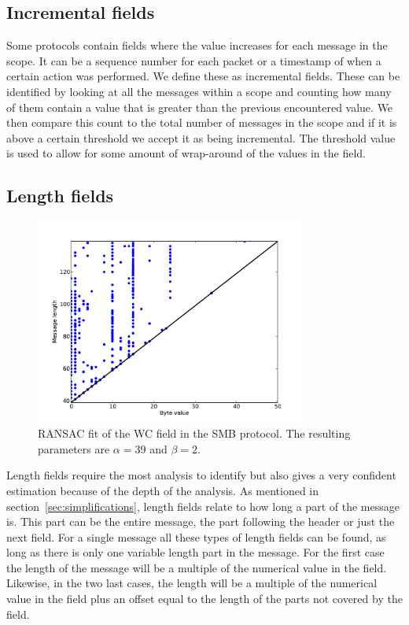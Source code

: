 \documentclass[a4paper]{report}
\begin{document}
\newpage

\subsection{Incremental fields}
Some protocols contain fields where the value increases for each message in the
scope. It can be a sequence number for each packet or a timestamp of when a
certain action was performed. We define these as incremental fields. These can
be identified by looking at all the messages within a scope and counting how
many of them contain a value that is greater than the previous encountered
value. We then compare this count to the total number of messages in the scope
and if it is above a certain threshold we accept it as being incremental. The
threshold value is used to allow for some amount of wrap-around of the values
in the field.

\subsection{Length fields}
\label{sec:length}

\begin{figure}[h]
    \centering
    \includegraphics[width=0.8\textwidth]{length}
    \captionsetup{width=0.8\textwidth}
    \caption{RANSAC fit of the WC field in the SMB protocol. The resulting
    parameters are $\alpha = 39$ and $\beta = 2$.}
    \label{fig:length}
\end{figure}

Length fields require the most analysis to identify but also gives a very
confident estimation because of the depth of the analysis. As mentioned in
section~\ref{sec:simplifications}, length fields relate to how long a part of
the message is. This part can be the entire message, the part following the
header or just the next field. For a single message all these types of length
fields can be found, as long as there is only one variable length part in the
message. For the first case the length of the message will be a multiple of the
numerical value in the field. Likewise, in the two last cases, the length will
be a multiple of the numerical value in the field plus an offset equal to the
length of the parts not covered by the field.
\end{document}
